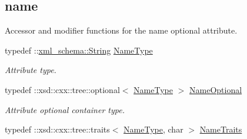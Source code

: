 \subsection*{name}
\label{_amgrpb068931cc450442b63f5b3d276ea4297}
Accessor and modifier functions for the name optional attribute. \begin{DoxyCompactItemize}
\item 
\hypertarget{classopenstack_1_1xml_1_1Server_a05dfa427fa9c16be745fcae54a806f7a}{
typedef ::\hyperlink{namespacexml__schema_af6757b5701ccc893f3b551bd70e0c94d}{xml\_\-schema::String} \hyperlink{classopenstack_1_1xml_1_1Server_a05dfa427fa9c16be745fcae54a806f7a}{NameType}}
\label{classopenstack_1_1xml_1_1Server_a05dfa427fa9c16be745fcae54a806f7a}

\begin{DoxyCompactList}\small\item\em Attribute type. \item\end{DoxyCompactList}\item 
\hypertarget{classopenstack_1_1xml_1_1Server_a500c18b8787bfe281ea268fc8e4fcc82}{
typedef ::xsd::cxx::tree::optional$<$ \hyperlink{classopenstack_1_1xml_1_1Server_a05dfa427fa9c16be745fcae54a806f7a}{NameType} $>$ \hyperlink{classopenstack_1_1xml_1_1Server_a500c18b8787bfe281ea268fc8e4fcc82}{NameOptional}}
\label{classopenstack_1_1xml_1_1Server_a500c18b8787bfe281ea268fc8e4fcc82}

\begin{DoxyCompactList}\small\item\em Attribute optional container type. \item\end{DoxyCompactList}\item 
\hypertarget{classopenstack_1_1xml_1_1Server_a8c42e0b868d4d1c90738f48d9a4645c0}{
typedef ::xsd::cxx::tree::traits$<$ \hyperlink{classopenstack_1_1xml_1_1Server_a05dfa427fa9c16be745fcae54a806f7a}{NameType}, char $>$ \hyperlink{classopenstack_1_1xml_1_1Server_a8c42e0b868d4d1c90738f48d9a4645c0}{NameTraits}}
\label{classopenstack_1_1xml_1_1Server_a8c42e0b868d4d1c90738f48d9a4645c0}


\end{DoxyCompactItemize}
